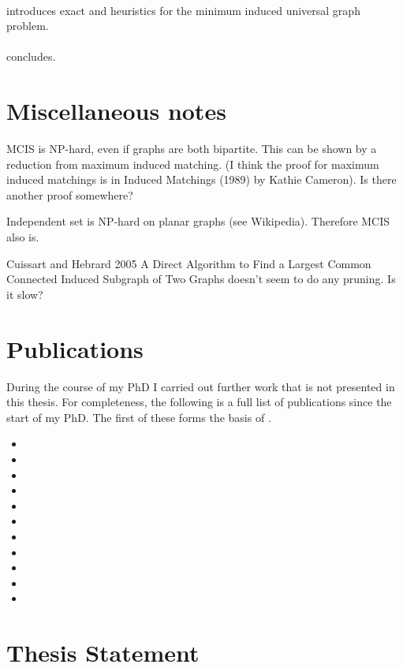 \paragraph*{} introduces exact and heuristics
for the minimum induced universal graph problem.

\paragraph*{} concludes.

\section{Miscellaneous notes}

MCIS is NP-hard, even if graphs are both bipartite.  This can be shown by a
reduction from maximum induced matching.  (I think the proof for maximum induced
matchings is in Induced Matchings (1989) by Kathie Cameron). Is there another
proof somewhere?

Independent set is NP-hard on planar graphs (see Wikipedia).  Therefore
MCIS also is.

Cuissart and Hebrard 2005 A Direct Algorithm to Find a Largest Common
Connected Induced Subgraph of Two Graphs doesn't seem to do any
pruning.  Is it slow?

\section{Publications}

During the course of my PhD I carried out further work
that is not presented in this thesis.
For completeness, the following is a full list of publications
since the start of my PhD.  The first of these
forms the basis of .

\begin{itemize}
    \item{}
    \item{}
    \item{}
    \item{}
    \item{}
    \item{}
    \item{}
    \item{}
    \item{}
    \item{}
    \item{}
\end{itemize}

\section{Thesis Statement}
\label{c:intro:thesisstatement}


